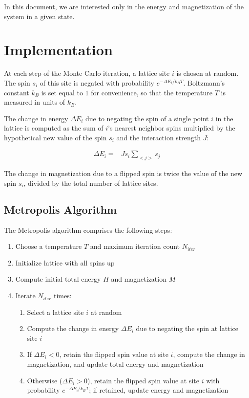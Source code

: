 \documentclass[]{article}
\begin{document}
In this document, we are interested only in the energy and magnetization of the system in a given state.

\section{\label{sec:imp}Implementation}

At each step of the Monte Carlo iteration, a lattice site $i$ is chosen at random. The spin $s_i$ of this site is negated with probability $e^{-\Delta E_i / k_B T}$. Boltzmann's constant $k_B$ is set equal to $1$ for convenience, so that the temperature $T$ is measured in units of $k_B$.

The change in energy $\Delta E_i$ due to negating the spin of a single point $i$ in the lattice is computed as the sum of $i$'s nearest neighbor spins multiplied by the hypothetical new value of the spin $s_i$ and the interaction strength $J$:

\begin{align}
\Delta E_i =& J s_i \sum_{<j>} s_j
\end{align}

The change in magnetization due to a flipped spin is twice the value of the new spin $s_i$, divided by the total number of lattice sites.

\subsection{\label{sec:alg}Metropolis Algorithm}

The Metropolis algorithm comprises the following steps:

\begin{enumerate}
 \item Choose a temperature $T$ and maximum iteration count $N_{iter}$
 \item Initialize lattice with all spins up
 \item Compute initial total energy $H$ and magnetization $M$
 \item Iterate $N_{iter}$ times:
 \begin{enumerate}
  \item Select a lattice site $i$ at random
  \item Compute the change in energy $\Delta E_i$ due to negating the spin at lattice site $i$
  \item If $\Delta E_i < 0$, retain the flipped spin value at site $i$, compute the change in magnetization, and update total energy and magnetization
  \item Otherwise ($\Delta E_i > 0$), retain the flipped spin value at site $i$ with probability $e^{-\Delta E_i / k_B T}$; if retained, update energy and magnetization
 \end{enumerate}
\end{enumerate}
\end{document}
